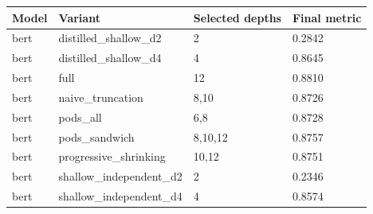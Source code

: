 \begin{tabular}{llll}
\hline
Model & Variant & Selected depths & Final metric \\
\hline
bert & distilled\_shallow\_d2 & 2 & 0.2842 \\
bert & distilled\_shallow\_d4 & 4 & 0.8645 \\
bert & full & 12 & 0.8810 \\
bert & naive\_truncation & 8,10 & 0.8726 \\
bert & pods\_all & 6,8 & 0.8728 \\
bert & pods\_sandwich & 8,10,12 & 0.8757 \\
bert & progressive\_shrinking & 10,12 & 0.8751 \\
bert & shallow\_independent\_d2 & 2 & 0.2346 \\
bert & shallow\_independent\_d4 & 4 & 0.8574 \\
\hline
\end{tabular}
